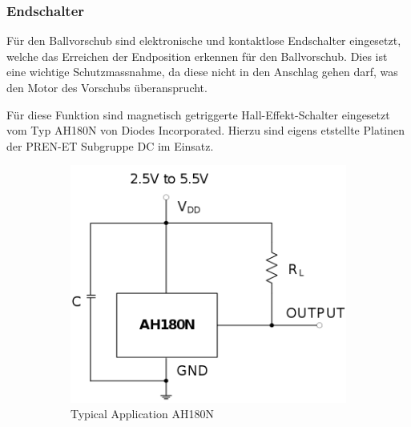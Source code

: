 \subsubsection{Endschalter}
Für den Ballvorschub sind elektronische und kontaktlose Endschalter
eingesetzt, welche das Erreichen der Endposition erkennen für den
Ballvorschub. Dies ist eine wichtige Schutzmassnahme, da diese
nicht in den Anschlag gehen darf, was den Motor des Vorschubs
überansprucht.

Für diese Funktion sind magnetisch getriggerte Hall-Effekt-Schalter
eingesetzt vom Typ AH180N von Diodes Incorporated. Hierzu sind eigens
etstellte Platinen der PREN-ET Subgruppe DC im Einsatz.

\begin{figure}[h!]
	\centering
	\begin{subfigure}[b]{0.45\textwidth}
		\centering
		\includegraphics[width=1\textwidth]{../../fig/et/ah180n.png}
		\caption{Typical Application AH180N}
	\end{subfigure}
	\begin{subfigure}[b]{0.45\textwidth}
		\centering

\end{subfigure}
\end{figure}
